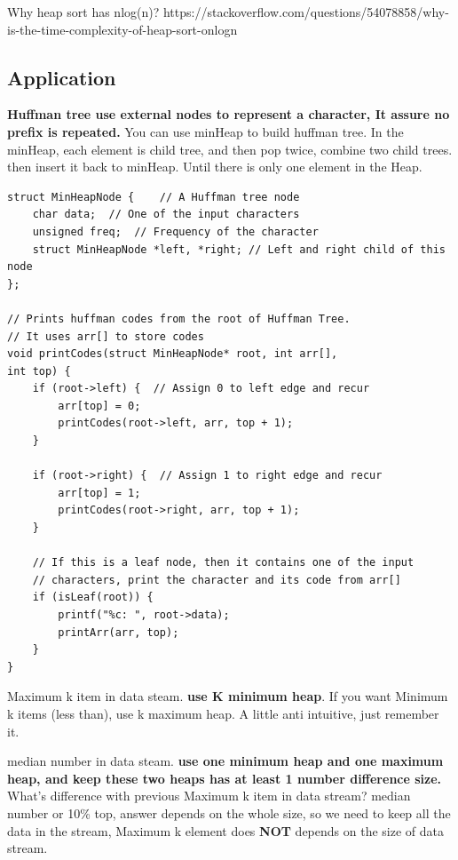 \documentclass[a4paper,11pt,twoside]{book}
\begin{document}
\par Why heap sort has nlog(n)? https://stackoverflow.com/questions/54078858/why-is-the-time-complexity-of-heap-sort-onlogn

\subsection{Application}


\par \textbf{Huffman tree use external nodes to represent a character, It assure no prefix is repeated.} You can use minHeap to build huffman tree. In the minHeap, each element is child tree, and then pop twice, combine two child trees. then insert it back to minHeap. Until there is only one element in the Heap. 

\begin{lstlisting}
struct MinHeapNode { 	// A Huffman tree node 
	char data;  // One of the input characters 
	unsigned freq;  // Frequency of the character 
	struct MinHeapNode *left, *right; // Left and right child of this node 
}; 

// Prints huffman codes from the root of Huffman Tree. 
// It uses arr[] to store codes 
void printCodes(struct MinHeapNode* root, int arr[], 
int top) { 
	if (root->left) {  // Assign 0 to left edge and recur 
		arr[top] = 0; 
		printCodes(root->left, arr, top + 1); 
	} 

	if (root->right) {  // Assign 1 to right edge and recur 
		arr[top] = 1; 
		printCodes(root->right, arr, top + 1); 
	} 
	
	// If this is a leaf node, then it contains one of the input 
	// characters, print the character and its code from arr[] 
	if (isLeaf(root)) { 
		printf("%c: ", root->data); 
		printArr(arr, top); 
	} 
} 
\end{lstlisting}

	\par Maximum k item in data steam. \textbf{use K minimum heap}. If you want Minimum k items (less than), use k maximum heap. A little anti intuitive, just remember it.

	\par median number in data steam. \textbf{use one minimum heap and one maximum heap, and keep these two heaps has at least 1 number difference size.}  What's difference with previous Maximum k item in data stream? median number or 10\% top,  answer depends on the whole size, so we need to keep all the data in the stream,  Maximum k element does \textbf{NOT} depends on the size of data stream.
\end{document}
